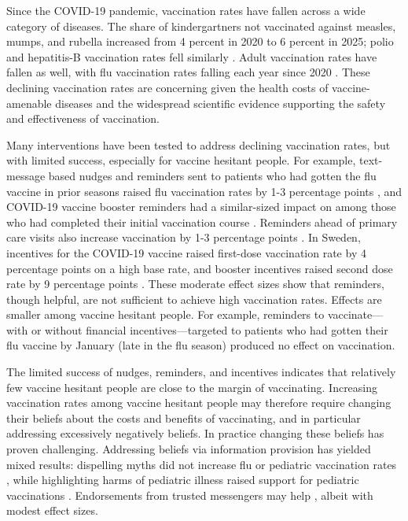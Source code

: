 Since the COVID-19 pandemic, vaccination rates have fallen across a wide category of diseases. 
The share of kindergartners not vaccinated against measles, mumps, and rubella increased from 4 
percent in 2020 to 6 percent in 2025; polio and hepatitis-B vaccination rates fell similarly
\citep{cdc_schoolvaxview_data}.
Adult vaccination rates have fallen as well, with flu vaccination rates falling each year 
since 2020 \citep{cdc_flu_vaccinations_weekly}.
These declining vaccination rates are concerning given the health costs of vaccine-amenable
diseases and the widespread scientific evidence supporting the safety and effectiveness of vaccination.

Many interventions have been tested to address declining vaccination rates, but with limited 
success, especially for vaccine hesitant people.
For example, text-message based nudges and reminders sent to patients who had gotten
the flu vaccine in prior seasons raised flu vaccination rates by 1-3 percentage points 
\citep{milkman2022680}, and COVID-19 vaccine booster reminders had a similar-sized 
impact on among those who had completed their initial vaccination course
\citep{chang2023reminders}. Reminders ahead of primary care visits also increase
vaccination by 1-3 percentage points \citep{patel2023randomized}. In Sweden, incentives for the COVID-19 vaccine
raised first-dose vaccination rate by 4 percentage points on a high base rate,
and booster incentives raised second dose rate by 9 percentage points
\citep{campos2024incentives}. These moderate effect sizes show that reminders, though helpful, 
are not sufficient to achieve high vaccination rates. Effects are smaller among 
vaccine hesitant people. For example, reminders to vaccinate---with or without
financial incentives---targeted to patients who had gotten their flu vaccine by 
January (late in the flu season) produced no effect on vaccination. 

The limited success of nudges, reminders, and incentives indicates that 
relatively few vaccine hesitant people are close to the margin of vaccinating.
Increasing vaccination rates among vaccine hesitant people may therefore require 
changing their beliefs about the costs and benefits of vaccinating, and in particular
addressing excessively negatively beliefs.
In practice changing these beliefs has proven challenging. Addressing beliefs 
via information provision has yielded mixed results: dispelling myths did not increase flu or 
pediatric vaccination rates \citep{nyhan2014effective, nyhan2015does}, 
while highlighting harms of pediatric illness raised support for pediatric vaccinations 
\citep{horne2015countering}. Endorsements from trusted messengers may help 
\citep{larsen2023counter,alsan2024experimental}, albeit with modest effect sizes. 

